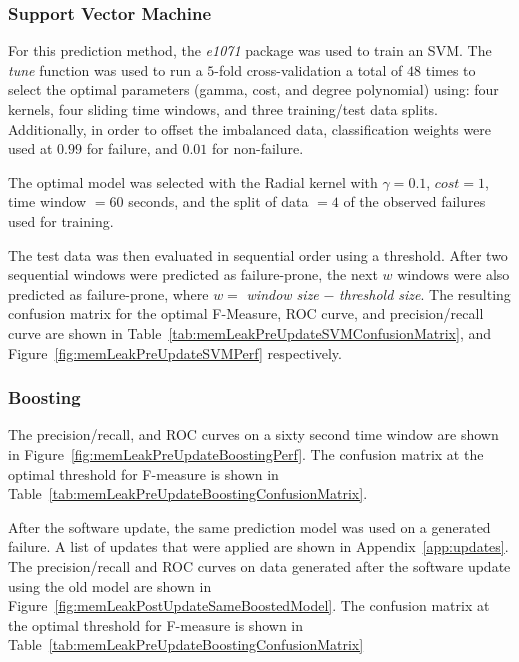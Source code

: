 \subsubsection{Support Vector Machine}
For this prediction method, the \emph{e1071} package was used to train an
\ac{SVM}.  The \emph{tune} function was used to run a $5$-fold cross-validation
a total of $48$ times to select the optimal parameters (gamma, cost, and degree
polynomial) using: four kernels, four sliding time windows, and three
training/test data splits.  Additionally, in order to offset the imbalanced
data, classification weights were used at $0.99$ for failure, and $0.01$ for
non-failure.

The optimal model was selected with the Radial kernel with $\gamma = 0.1$,
$cost = 1$, time window $= 60$ seconds, and the split of data $= 4$ of the
observed failures used for training.

The test data was then evaluated in sequential order using a threshold.  After
two sequential windows were predicted as failure-prone, the next $w$ windows
were also predicted as failure-prone, where $w = $ \emph{window size} $-$
\emph{threshold size}.  The resulting confusion matrix for the optimal
F-Measure, \ac{ROC} curve, and precision/recall curve are shown in
Table~\ref{tab:memLeakPreUpdateSVMConfusionMatrix}, and
Figure~\ref{fig:memLeakPreUpdateSVMPerf} respectively.

\figMemLeakPreUpdateSVMPerf
\tabMemLeakPreUpdateSVMConfusionMatrix

\subsubsection{Boosting}
The precision/recall, and \ac{ROC} curves on a sixty second time window are
shown in Figure~\ref{fig:memLeakPreUpdateBoostingPerf}.  The confusion matrix
at the optimal threshold for F-measure is shown in
Table~\ref{tab:memLeakPreUpdateBoostingConfusionMatrix}.

\figMemLeakPreUpdateBoostingPerf
\tabMemLeakPreUpdateBoostingConfusionMatrix

After the software update, the same prediction model was used on a generated
failure.  A list of updates that were applied are shown in
Appendix~\ref{app:updates}.  The precision/recall and \ac{ROC} curves on data
generated after the software update using the old model are shown in
Figure~\ref{fig:memLeakPostUpdateSameBoostedModel}.  The confusion matrix at
the optimal threshold for F-measure is shown in
Table~\ref{tab:memLeakPreUpdateBoostingConfusionMatrix}

